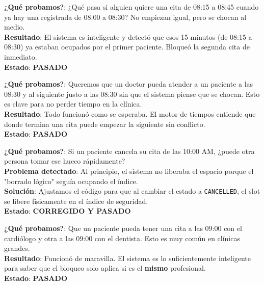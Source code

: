 \documentclass[a4paper,11pt]{article}
\begin{document}
  \begin{tcolorbox}[colback=green!5,colframe=green!50!black,title=\textbf{PRUEBA ST-02: Traslape Parcial (Choque de Horas)}]
  \textbf{¿Qué probamos?}: ¿Qué pasa si alguien quiere una cita de 08:15 a 08:45 cuando ya hay una registrada de 08:00 a 08:30? No empiezan igual, pero se chocan al medio. \\
  \textbf{Resultado}: El sistema es inteligente y detectó que esos 15 minutos (de 08:15 a 08:30) ya estaban ocupados por el primer paciente. Bloqueó la segunda cita de inmediato. \\
  \textbf{Estado}: \color{green!60!black}\textbf{PASADO}
  \end{tcolorbox}

  \begin{tcolorbox}[colback=yellow!5,colframe=orange!70!black,title=\textbf{PRUEBA ST-03: Citas Seguidas (Adyacencia)}]
  \textbf{¿Qué probamos?}: Queremos que un doctor pueda atender a un paciente a las 08:30 y al siguiente justo a las 08:30 sin que el sistema piense que se chocan. Esto es clave para no perder tiempo en la clínica. \\
  \textbf{Resultado}: Todo funcionó como se esperaba. El motor de tiempos entiende que donde termina una cita puede empezar la siguiente sin conflicto. \\
  \textbf{Estado}: \color{orange}\textbf{PASADO}
  \end{tcolorbox}

  \begin{tcolorbox}[colback=purple!5,colframe=purple!70!black,title=\textbf{PRUEBA ST-04: Cancelar y Reusar (Slot Libre)}]
  \textbf{¿Qué probamos?}: Si un paciente cancela su cita de las 10:00 AM, ¿puede otra persona tomar ese hueco rápidamente? \\
  \textbf{Problema detectado}: Al principio, el sistema no liberaba el espacio porque el "borrado lógico" seguía ocupando el índice. \\
  \textbf{Solución}: Ajustamos el código para que al cambiar el estado a \texttt{CANCELLED}, el slot se libere físicamente en el índice de seguridad. \\
  \textbf{Estado}: \color{purple}\textbf{CORREGIDO Y PASADO}
  \end{tcolorbox}

  \begin{tcolorbox}[colback=cyan!5,colframe=cyan!70!black,title=\textbf{PRUEBA ST-05: Citas con Doctores Diferentes}]
  \textbf{¿Qué probamos?}: Que un paciente pueda tener una cita a las 09:00 con el cardiólogo y otra a las 09:00 con el dentista. Esto es muy común en clínicas grandes. \\
  \textbf{Resultado}: Funcionó de maravilla. El sistema es lo suficientemente inteligente para saber que el bloqueo solo aplica si es el \textbf{mismo} profesional. \\
  \textbf{Estado}: \color{cyan!80!black}\textbf{PASADO}
  \end{tcolorbox}
\end{document}
